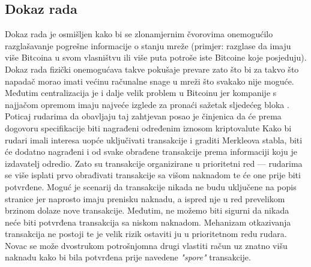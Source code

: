 \documentclass[utf8, zavrsni]{fer}
\begin{document}
\subsection{Dokaz rada}
Dokaz rada je osmišljen kako bi se zlonamjernim čvorovima onemogućilo razglašavanje pogrešne informacije o stanju mreže (primjer: razglase da imaju više Bitcoina u svom vlasništvu ili više puta potroše iste Bitcoine koje posjeduju). Dokaz rada fizički onemogućava takve pokušaje prevare zato što bi za takvo što napadač morao imati većinu računalne snage u mreži što svakako nije moguće. Međutim centralizacija je i dalje velik problem u Bitcoinu jer kompanije s najjačom opremom imaju najveće izglede za pronaći sažetak sljedećeg bloka \cite{9160462}. Poticaj rudarima da obavljaju taj zahtjevan posao je činjenica da će prema dogovoru specifikacije biti nagrađeni određenim iznosom kriptovalute\footnotemark
{}
Kako bi rudari imali interesa uopće uključivati transakcije i graditi Merkleova stabla, biti će dodatno nagrađeni i od svake obrađene transakcije prema informaciji koju je izdavatelj odredio. Zato su transakcije organizirane u prioritetni red --- rudarima se više isplati prvo obrađivati transakcije sa višom naknadom te će one prije biti potvrđene. Moguć je scenarij da transakcije nikada ne budu uključene na popis stranice jer naprosto imaju prenisku naknadu, a ispred nje u red prevelikom brzinom dolaze nove transakcije. Međutim, ne možemo biti sigurni da nikada neće biti potvrđena transakcija sa niskom naknadom. Mehanizam otkazivanja transakcija ne postoji te je velik rizik ostaviti ju u prioritetnom redu rudara. Novac se može  dvostrukom potrošnjom\footnotemark na drugi vlastiti račun uz znatno višu naknadu kako bi bila potvrđena prije navedene \textit{"spore"} transakcije.
\end{document}
